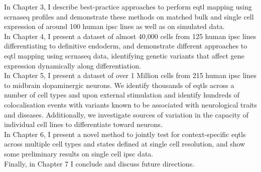 In Chapter 3, I describe best-practice approaches to perform \gls{eqtl} mapping using \gls{scrnaseq} profiles and demonstrate these methods on matched bulk and single cell expression of around 100 human \gls{ipsc} lines as well as on simulated data.  \\

In Chapter 4, I present a dataset of almost 40,000 cells from 125 human \gls{ipsc} lines differentiating to definitive endoderm, and demonstrate different approaches to \gls{eqtl} mapping using \gls{scrnaseq} data, identifying genetic variants that affect gene expression dynamically along differentiation. \\

In Chapter 5, I present a dataset of over 1 Million cells from 215 human \gls{ipsc} lines to midbrain dopaminergic neurons.
We identify thousands of \glspl{eqtl} across a number of cell types and upon external stimulation and identify hundreds of colocalisation events with variants known to be associated with neurological traits and diseases.
Additionally, we investigate sources of variation in the capacity of individual cell lines to differentiate toward neurons.\\

In Chapter 6, I present a novel method to jointly test for context-specific \glspl{eqtl} across multiple cell types and states defined at single cell resolution, and show some preliminary results on single cell \gls{ipsc} data. \\

Finally, in Chapter 7 I conclude and discuss future directions.